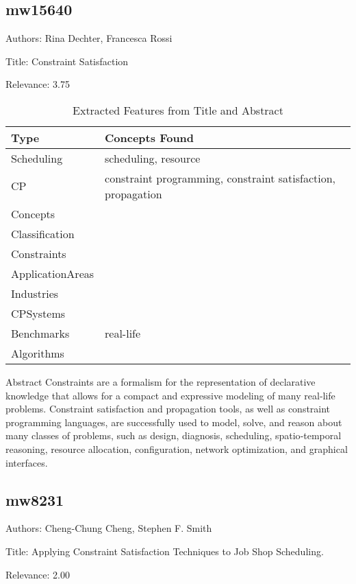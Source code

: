 \subsection{mw15640}
\label{mw:mw15640}

Authors: Rina Dechter, Francesca Rossi

Title: Constraint Satisfaction

Relevance:  3.75

{\scriptsize
\begin{longtable}{p{2cm}p{20cm}}
\caption{Extracted Features from Title and Abstract}\\ \toprule
Type & Concepts Found\\ \midrule
\endhead
\bottomrule
\endfoot
Scheduling & scheduling, resource\\ 
CP & constraint programming, constraint satisfaction, propagation\\ 
Concepts & \\ 
Classification & \\ 
Constraints & \\ 
ApplicationAreas & \\ 
Industries & \\ 
CPSystems & \\ 
Benchmarks & real-life\\ 
Algorithms & \\ 
\end{longtable}
}

 Abstract 
           Constraints are a formalism for the representation of declarative knowledge that allows for a compact and expressive modeling of many real‐life problems. Constraint satisfaction and propagation tools, as well as constraint programming languages, are successfully used to model, solve, and reason about many classes of problems, such as design, diagnosis, scheduling, spatio‐temporal reasoning, resource allocation, configuration, network optimization, and graphical interfaces. 

\subsection{mw8231}
\label{mw:mw8231}

Authors: Cheng-Chung Cheng, Stephen F. Smith

Title: Applying Constraint Satisfaction Techniques to Job Shop Scheduling.

Relevance:  2.00

